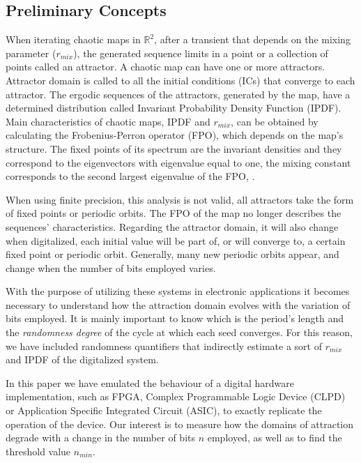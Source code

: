 \subsection{Preliminary Concepts} \label{sec:estudio}
When iterating chaotic maps in $\mathbb{R}^2$, after a transient that depends on the mixing parameter ($r_{mix}$), the generated sequence limits in a point or a collection of points called an attractor.
A chaotic map can have one or more attractors.
Attractor domain is called to all the initial conditions (ICs) that converge to each attractor.
The ergodic sequences of the attractors, generated by the map, have a determined distribution called Invariant Probability Density Function (IPDF).
Main characteristics of chaotic maps, IPDF and $r_{mix}$, can be obtained by calculating the Frobenius-Perron operator (FPO), which depends on the map's structure.
The fixed points of its spectrum are the invariant densities and they correspond to the eigenvectors with eigenvalue equal to one, the mixing constant corresponds to the second largest eigenvalue of the FPO, \cite{Lasota1994,Lasota1973}.

When using finite precision, this analysis is not valid, all attractors take the form of fixed points or periodic orbits.
The FPO of the map no longer describes the sequences' characteristics.
Regarding the attractor domain, it will also change when digitalized, each initial value will be part of, or will converge to, a certain fixed point or periodic orbit.
Generally, many new periodic orbits appear, and change when the number of bits employed varies.

With the purpose of utilizing these systems in electronic applications it becomes necessary to understand how the attraction domain evolves with the variation of bits employed.
It is mainly important to know which is the period's length and the \textsl{randomness degree} of the cycle at which each seed converges.
For this reason, we have included randomness quantifiers that indirectly estimate a sort of $r_{mix}$ and IPDF of the digitalized system.

In this paper we have emulated the behaviour of a digital hardware implementation, such as FPGA, Complex Programmable Logic Device (CLPD) or Application Specific Integrated Circuit (ASIC), to exactly replicate the operation of the device.
Our interest is to measure how the domains of attraction degrade with a change in the number of bits $n$ employed, as well as to find the threshold value 
$n_{min}$. 
